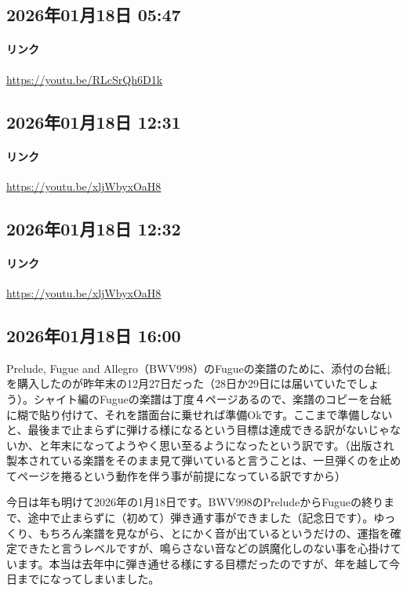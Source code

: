 \subsection*{2026年01月18日 05:47}

\paragraph{リンク}
\url{https://youtu.be/RLcSrQh6D1k}

\subsection*{2026年01月18日 12:31}

\paragraph{リンク}
\url{https://youtu.be/xljWbyxOaH8}

\subsection*{2026年01月18日 12:32}

\paragraph{リンク}
\url{https://youtu.be/xljWbyxOaH8}

\subsection*{2026年01月18日 16:00}

Prelude, Fugue and Allegro（BWV998）のFugueの楽譜のために、添付の台紙↓を購入したのが昨年末の12月27日だった（28日か29日には届いていたでしょう）。シャイト編のFugueの楽譜は丁度４ページあるので、楽譜のコピーを台紙に糊で貼り付けて、それを譜面台に乗せれば準備Okです。ここまで準備しないと、最後まで止まらずに弾ける様になるという目標は達成できる訳がないじゃないか、と年末になってようやく思い至るようになったという訳です。（出版され製本されている楽譜をそのまま見て弾いていると言うことは、一旦弾くのを止めてページを捲るという動作を伴う事が前提になっている訳ですから）

今日は年も明けて2026年の1月18日です。BWV998のPreludeからFugueの終りまで、途中で止まらずに（初めて）弾き通す事ができました（記念日です）。ゆっくり、もちろん楽譜を見ながら、とにかく音が出ているというだけの、運指を確定できたと言うレベルですが、鳴らさない音などの誤魔化しのない事を心掛けています。本当は去年中に弾き通せる様にする目標だったのですが、年を越して今日までになってしまいました。

